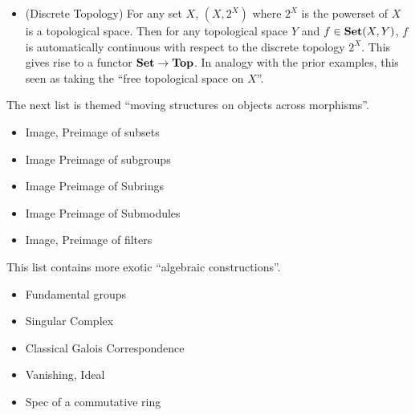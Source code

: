 \begin{eg}
\begin{itemize}
    \item (Discrete Topology)
    For any set $X$, $(X,2^X)$ where $2^X$ is the powerset of $X$
    is a topological space. 
    Then for any topological space $Y$ and $f \in \mathbf{Set}(X,Y)$,
    $f$ is automatically continuous with respect to the discrete topology $2^X$.
    This gives rise to a functor $\mathbf{Set} \to \mathbf{Top}$.
    In analogy with the prior examples, 
    this seen as taking the ``free topological space on $X$''.

  \end{itemize}

  The next list is themed ``moving structures on objects across morphisms''.
  \begin{itemize}
    \item Image, Preimage of subsets
    \item Image Preimage of subgroups
    \item Image Preimage of Subrings
    \item Image Preimage of Submodules
    \item Image, Preimage of filters
  \end{itemize}

  This list contains more exotic ``algebraic constructions''.
  \begin{itemize}
    \item Fundamental groups
    \item Singular Complex
    \item Classical Galois Correspondence
    \item Vanishing, Ideal
    \item Spec of a commutative ring
  \end{itemize}


\end{eg}

